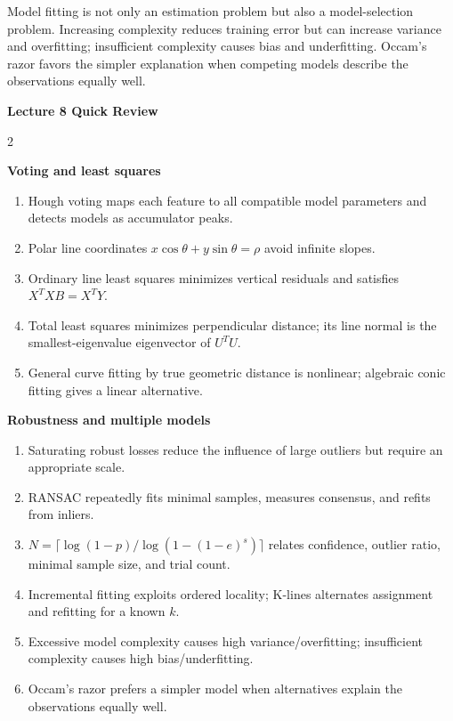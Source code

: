 \documentclass[11pt,a4paper,oneside]{report}
\newcommand{\reviewgroup}[1]{%
  \par\vspace{0.7em}%
  {\sffamily\bfseries\color{SapienzaRed}#1}\par\vspace{0.10em}%
}
\begin{document}
\begin{chaptersummary}
Model fitting is not only an estimation problem but also a model-selection problem. Increasing complexity reduces training error but can increase variance and overfitting; insufficient complexity causes bias and underfitting. Occam's razor favors the simpler explanation when competing models describe the observations equally well.
\end{chaptersummary}

\clearpage
{}
{}
\begin{center}
{\sffamily\fontsize{22}{26}\selectfont\bfseries\color{Ink}Lecture 8 Quick Review\par}
\vspace{0.35em}{\color{SapienzaRed}\rule{0.82\textwidth}{0.8pt}}
\end{center}
\begin{multicols}{2}
\normalsize
\reviewgroup{Voting and least squares}
\begin{enumerate}[label=\textcolor{SapienzaRed}{\bfseries\arabic*.},leftmargin=1.8em,itemsep=0.36em]
\item Hough voting maps each feature to all compatible model parameters and detects models as accumulator peaks.
\item Polar line coordinates $x\cos\theta+y\sin\theta=\rho$ avoid infinite slopes.
\item Ordinary line least squares minimizes vertical residuals and satisfies $X^TXB=X^TY$.
\item Total least squares minimizes perpendicular distance; its line normal is the smallest-eigenvalue eigenvector of $U^TU$.
\item General curve fitting by true geometric distance is nonlinear; algebraic conic fitting gives a linear alternative.
\end{enumerate}
\reviewgroup{Robustness and multiple models}
\begin{enumerate}[resume,label=\textcolor{SapienzaRed}{\bfseries\arabic*.},leftmargin=1.8em,itemsep=0.36em]
\item Saturating robust losses reduce the influence of large outliers but require an appropriate scale.
\item RANSAC repeatedly fits minimal samples, measures consensus, and refits from inliers.
\item $N=\lceil\log(1-p)/\log(1-(1-e)^s)\rceil$ relates confidence, outlier ratio, minimal sample size, and trial count.
\item Incremental fitting exploits ordered locality; K-lines alternates assignment and refitting for a known $k$.
\item Excessive model complexity causes high variance/overfitting; insufficient complexity causes high bias/underfitting.
\item Occam's razor prefers a simpler model when alternatives explain the observations equally well.
\end{enumerate}
\end{multicols}
\end{document}
